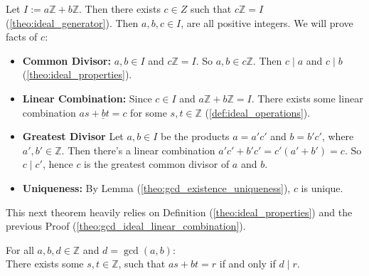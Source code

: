 \begin{Proof}

    \label{proof:gcd_ideal_linear_combination}

    Let $I:=a\mathbb{Z} + b\mathbb{Z}$. Then there exists $c\in Z$ such that $c\mathbb{Z} = I$ (\ref{theo:ideal_generator}). Then $a,b,c\in I$, are all
    positive integers. We will prove facts of $c$:
    \begin{itemize}
        \item \textbf{Common Divisor: }$a,b\in I$ and $c\mathbb{Z}=I$. So $a,b\in c\mathbb{Z}$. Then $c\mid a$ and $c\mid b$ (\ref{theo:ideal_properties}).
        \item \textbf{Linear Combination:} Since $c\in I$ and $a\mathbb{Z} + b\mathbb{Z} = I$. There exists some linear combination $\underline{as+bt=c}$ for some $s,t\in\mathbb{Z}$ (\ref{def:ideal_operations}).
        \item \textbf{Greatest Divisor} Let $a,b\in I$ be the products $a=a'c'$ and $b=b'c'$, where $a',b'\in\mathbb{Z}$.
              Then there's a linear combination $a'c'+b'c'=c'(a'+b')=c$. So $c\mid c'$, hence $c$ is the greatest common divisor of $a$ and $b$.
        \item \textbf{Uniqueness:} By Lemma (\ref{theo:gcd_existence_uniqueness}), $c$ is unique.
    \end{itemize}
\end{Proof}

\newpage

\noindent
This next theorem heavily relies on Definition (\ref{theo:ideal_properties}) and the previous Proof (\ref{theo:gcd_ideal_linear_combination}).
\begin{theo}

    \label{theo:element_linear_combinations}

    For all \(a, b,d \in \mathbb{Z}\) and $d=\gcd(a,b)$:\\
    There exists some \(s, t \in \mathbb{Z}\), such that \(as + bt = r\) if and only if $d\mid r$.
        
\end{theo}


